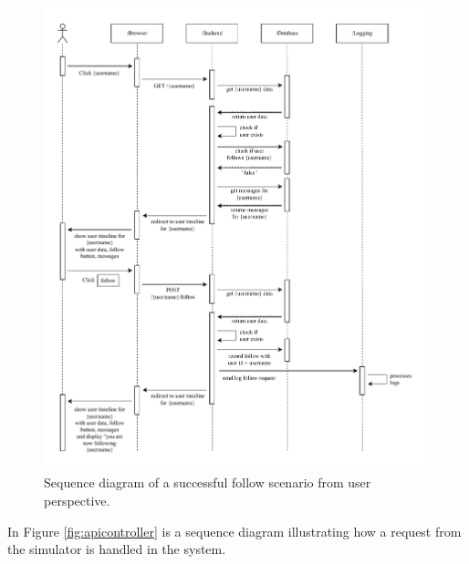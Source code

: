 \begin{figure}[H]
  \begin{center}
\includegraphics[width=\textwidth]{images/figures/Sequence-client.pdf}
    \caption{Sequence diagram of a successful follow scenario from user perspective.}
    \label{fig:homecontroller}
  \end{center}
\end{figure}

\newpage

\noindent In Figure \ref{fig:apicontroller} is a sequence diagram illustrating how a request from the simulator is handled in the system.

